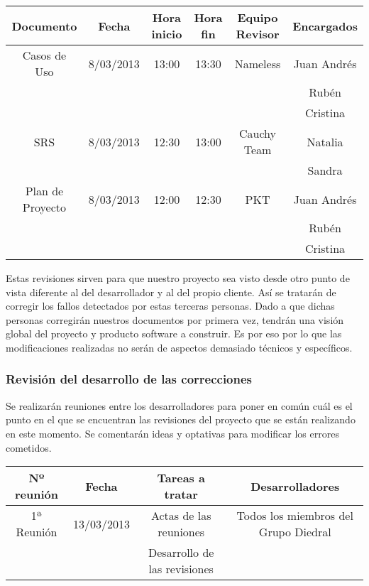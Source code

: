 \documentclass[11pt, a4paper, twoside, titlepage]{article}
\begin{document}
			\begin{center}
				\begin{tabular}{| c | c | c | c | c | c |}
				\hline
				\bfseries Documento	& \bfseries Fecha & \bfseries Hora inicio & \bfseries Hora fin & \bfseries Equipo Revisor &  \bfseries Encargados \\ \hline
				Casos de Uso 		& 8/03/2013	& 13:00	& 13:30	& Nameless	& Juan Andrés	\\ 								&		&	&	&		& Rubén		\\
							&		&	&	&		& Cristina	\\ \hline
				SRS 			& 8/03/2013	& 12:30	& 13:00 & Cauchy Team 	& Natalia	\\
							&		&	&	&		& Sandra	\\ \hline
				Plan de Proyecto	& 8/03/2013	& 12:00 & 12:30 & PKT		& Juan Andrés	\\
							&		&	&	&		& Rubén		\\
							&		&	&	&		& Cristina	\\ \hline
				\end{tabular}
			\end{center}
			
			Estas revisiones sirven para que nuestro proyecto sea visto desde otro punto de vista diferente al del desarrollador y al del propio cliente. Así se tratarán de corregir los fallos detectados por estas terceras personas. Dado a que dichas personas corregirán nuestros documentos por primera vez, tendrán una visión global del proyecto y producto software a construir. Es por eso por lo que las modificaciones realizadas no serán de aspectos demasiado técnicos y específicos.

			\subsubsection{Revisión del desarrollo de las correcciones}
				Se realizarán reuniones entre los desarrolladores para poner en común cuál es el punto en el que se encuentran las revisiones del proyecto que se están realizando en este momento. Se comentarán ideas y optativas para modificar los errores cometidos.
		
		\begin{center}
				\begin{tabular}{| c | c | c | c |}
				\hline
				\bfseries Nº reunión	& \bfseries Fecha 	& \bfseries Tareas a tratar 	& \bfseries Desarrolladores	\\ \hline
				1ª Reunión	& 13/03/2013 	& Actas de las reuniones & Todos los miembros del Grupo Diedral	\\ 							&		& Desarrollo de las revisiones &				\\ \hline
				\end{tabular}
			\end{center}
			
\end{document}
